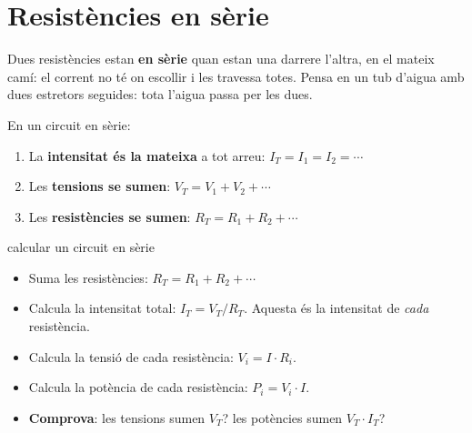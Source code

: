 \section{Resistències en sèrie}

Dues resistències estan \textbf{en sèrie} quan estan una darrere l'altra, en el mateix camí: el corrent no té on escollir i les travessa totes. Pensa en un tub d'aigua amb dues estretors seguides: tota l'aigua passa per les dues.

\begin{center}\end{center}

\begin{idea}
En un circuit en sèrie:
\begin{enumerate}[label=\textbf{\arabic*.}]
 \item La \textbf{intensitat és la mateixa} a tot arreu: \quad $I_T = I_1 = I_2 = \cdots$
 \item Les \textbf{tensions se sumen}: \quad $V_T = V_1 + V_2 + \cdots$
 \item Les \textbf{resistències se sumen}: \quad $R_T = R_1 + R_2 + \cdots$
\end{enumerate}
\end{idea}

\begin{metode}{calcular un circuit en sèrie}
\begin{itemize}
 \item[\textbf{\ding{172}}] Suma les resistències: $R_T = R_1 + R_2 + \cdots$
 \item[\textbf{\ding{173}}] Calcula la intensitat total: $I_T = V_T / R_T$. Aquesta és la intensitat de \emph{cada} resistència.
 \item[\textbf{\ding{174}}] Calcula la tensió de cada resistència: $V_i = I \cdot R_i$.
 \item[\textbf{\ding{175}}] Calcula la potència de cada resistència: $P_i = V_i \cdot I$.
 \item[\textbf{\ding{176}}] \textbf{Comprova}: les tensions sumen $V_T$? les potències sumen $V_T \cdot I_T$?
\end{itemize}
\end{metode}

